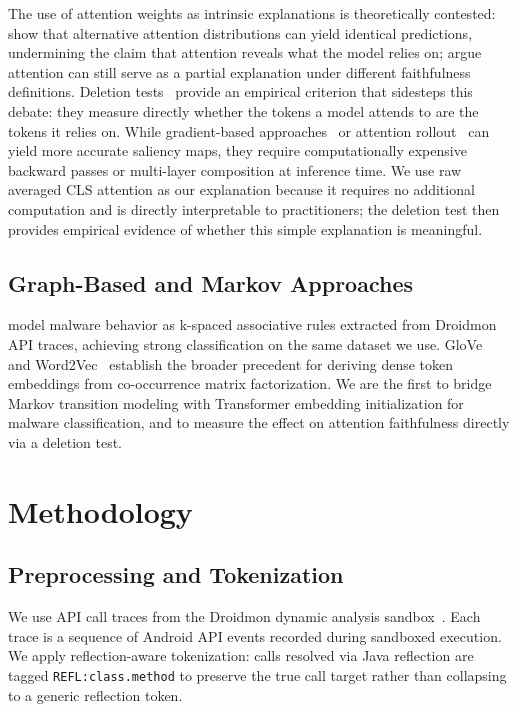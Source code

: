 \documentclass[12pt]{article}
\begin{document}
The use of attention weights as
intrinsic explanations is theoretically contested: \citet{jain2019attention} show that alternative attention
distributions can yield identical predictions, undermining the claim
that attention reveals what the model relies on; \citet{wiegreffe2019attention} argue attention can still serve as
a partial explanation under different faithfulness definitions.
Deletion tests~\citep{samek2017evaluating} provide an empirical criterion that sidesteps this debate: they measure directly
whether the tokens a model attends to are the tokens it relies on.
While gradient-based approaches~\citep{sundararajan2017integrated} or
attention rollout~\citep{abnar2020rollout} can yield more accurate saliency maps,
they require computationally expensive backward passes or multi-layer
composition at inference time. We use raw averaged CLS attention as our explanation
because it requires no additional computation and is directly
interpretable to practitioners; the deletion test then provides
empirical evidence of whether this simple explanation is meaningful.

\subsection{Graph-Based and Markov Approaches}
\citet{dangelo2023kspaced} model malware behavior as
k-spaced associative rules extracted from Droidmon API traces, achieving
strong classification on the same dataset we use.
GloVe~\citep{pennington2014glove} and Word2Vec~\citep{mikolov2013word2vec}
establish the broader precedent for deriving dense token embeddings from
co-occurrence matrix factorization. We are the first to bridge Markov
transition modeling with Transformer embedding initialization for malware
classification, and to measure the effect on attention faithfulness
directly via a deletion test.

\section{Methodology}

\subsection{Preprocessing and Tokenization}
We use API call traces from the Droidmon dynamic analysis
sandbox~\citep{droidmon}. Each trace is a sequence of Android API events
recorded during sandboxed execution. We apply reflection-aware
tokenization: calls resolved via Java reflection are tagged
\texttt{REFL:class.method} to preserve the true call target rather than
collapsing to a generic reflection token.
\end{document}
